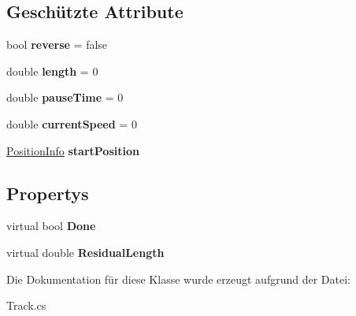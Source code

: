 \subsection*{Geschützte Attribute}
\begin{DoxyCompactItemize}
\item 
\hypertarget{class_robot_ctrl_1_1_track_a98f9e9a8f087b8c7770d8f8320d821c5}{
bool {\bfseries reverse} = false}
\label{class_robot_ctrl_1_1_track_a98f9e9a8f087b8c7770d8f8320d821c5}

\item 
\hypertarget{class_robot_ctrl_1_1_track_ad4fd8df6c4813180fe764d327a9a9af8}{
double {\bfseries length} = 0}
\label{class_robot_ctrl_1_1_track_ad4fd8df6c4813180fe764d327a9a9af8}

\item 
\hypertarget{class_robot_ctrl_1_1_track_a98771bf28c921adf67e6df981dcf8e2a}{
double {\bfseries pauseTime} = 0}
\label{class_robot_ctrl_1_1_track_a98771bf28c921adf67e6df981dcf8e2a}

\item 
\hypertarget{class_robot_ctrl_1_1_track_ac8722c422d19d4b18430b106275bc9f9}{
double {\bfseries currentSpeed} = 0}
\label{class_robot_ctrl_1_1_track_ac8722c422d19d4b18430b106275bc9f9}

\item 
\hypertarget{class_robot_ctrl_1_1_track_a731b5abc7baa77c51b72c5dea7cbfba8}{
\hyperlink{struct_robot_ctrl_1_1_position_info}{PositionInfo} {\bfseries startPosition}}
\label{class_robot_ctrl_1_1_track_a731b5abc7baa77c51b72c5dea7cbfba8}

\end{DoxyCompactItemize}
\subsection*{Propertys}
\begin{DoxyCompactItemize}
\item 
\hypertarget{class_robot_ctrl_1_1_track_ad1c4864f7171475914ef5c0111a0d901}{
virtual bool {\bfseries Done}}
\label{class_robot_ctrl_1_1_track_ad1c4864f7171475914ef5c0111a0d901}

\item 
\hypertarget{class_robot_ctrl_1_1_track_a4f01da358c21733d43ac272d3fb549cc}{
virtual double {\bfseries ResidualLength}}
\label{class_robot_ctrl_1_1_track_a4f01da358c21733d43ac272d3fb549cc}

\end{DoxyCompactItemize}


Die Dokumentation für diese Klasse wurde erzeugt aufgrund der Datei:\begin{DoxyCompactItemize}
\item 
Track.cs\end{DoxyCompactItemize}
